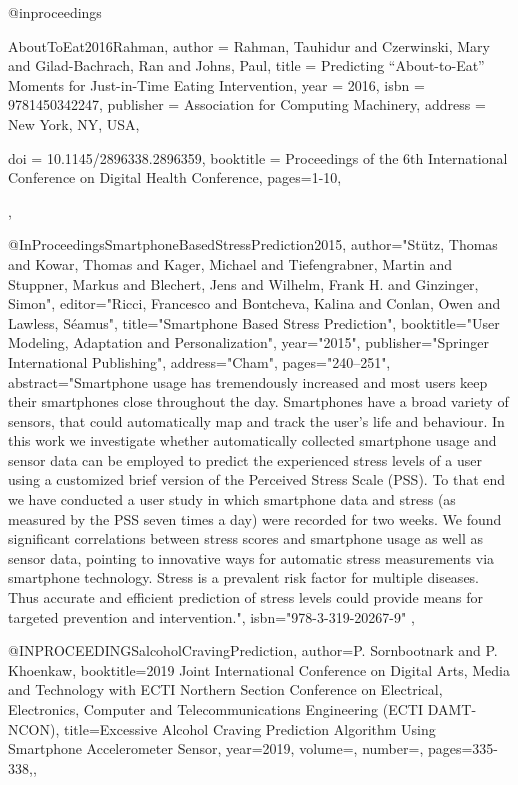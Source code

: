 @inproceedings{AboutToEat2016Rahman, 
author = {Rahman, Tauhidur and Czerwinski, Mary and Gilad-Bachrach, Ran and Johns, Paul}, 
title = {Predicting \enquote{About-to-Eat} Moments for Just-in-Time Eating Intervention}, 
year = {2016}, 
isbn = {9781450342247}, 
publisher = {Association for Computing Machinery}, 
address = {New York, NY, USA}, 

doi = {10.1145/2896338.2896359}, 
booktitle = {Proceedings of the 6th International Conference on Digital Health Conference},
pages={1-10},
},

@InProceedings{SmartphoneBasedStressPrediction2015,
author="St{\"u}tz, Thomas
and Kowar, Thomas
and Kager, Michael
and Tiefengrabner, Martin
and Stuppner, Markus
and Blechert, Jens
and Wilhelm, Frank H.
and Ginzinger, Simon",
editor="Ricci, Francesco
and Bontcheva, Kalina
and Conlan, Owen
and Lawless, S{\'e}amus",
title="Smartphone Based Stress Prediction",
booktitle="User Modeling, Adaptation and Personalization",
year="2015",
publisher="Springer International Publishing",
address="Cham",
pages="240--251",
abstract="Smartphone usage has tremendously increased and most users keep their smartphones close throughout the day. Smartphones have a broad variety of sensors, that could automatically map and track the user's life and behaviour. In this work we investigate whether automatically collected smartphone usage and sensor data can be employed to predict the experienced stress levels of a user using a customized brief version of the Perceived Stress Scale (PSS). To that end we have conducted a user study in which smartphone data and stress (as measured by the PSS seven times a day) were recorded for two weeks. We found significant correlations between stress scores and smartphone usage as well as sensor data, pointing to innovative ways for automatic stress measurements via smartphone technology. Stress is a prevalent risk factor for multiple diseases. Thus accurate and efficient prediction of stress levels could provide means for targeted prevention and intervention.",
isbn="978-3-319-20267-9"
},

@INPROCEEDINGS{alcoholCravingPrediction,  
author={P. {Sornbootnark} and P. {Khoenkaw}},  
booktitle={2019 Joint International Conference on Digital Arts, Media and Technology with ECTI Northern Section Conference on Electrical, Electronics, Computer and Telecommunications Engineering (ECTI DAMT-NCON)},  
title={Excessive Alcohol Craving Prediction Algorithm Using Smartphone Accelerometer Sensor},   
year={2019},  
volume={},  
number={},  
pages={335-338},},


